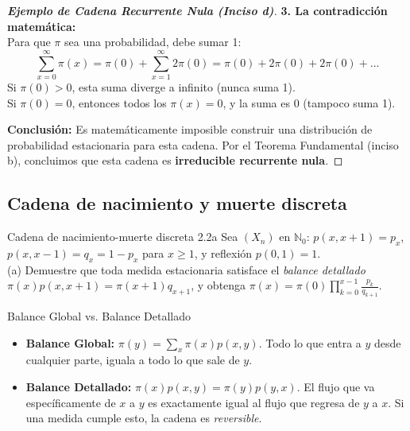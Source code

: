 \documentclass[10pt,a4paper]{article}
\begin{document}
\begin{proof}[\textbf{Ejemplo de Cadena Recurrente Nula (Inciso d)}]
    \textbf{3. La contradicción matemática:} \\
    Para que $\pi$ sea una probabilidad, debe sumar 1:
    \[ \sum_{x=0}^{\infty} \pi(x) = \pi(0) + \sum_{x=1}^{\infty} 2\pi(0) = \pi(0) + 2\pi(0) + 2\pi(0) + \dots \]
    Si $\pi(0) > 0$, esta suma diverge a infinito (nunca suma 1). \\
    Si $\pi(0) = 0$, entonces todos los $\pi(x) = 0$, y la suma es 0 (tampoco suma 1).
    
    \textbf{Conclusión:} Es matemáticamente imposible construir una distribución de probabilidad estacionaria para esta cadena. Por el Teorema Fundamental (inciso b), concluimos que esta cadena es \textbf{irreducible recurrente nula}.
\end{proof}

\newpage
\subsection{Cadena de nacimiento y muerte discreta}

\vspace{5mm}

\begin{ejercicio}{Cadena de nacimiento-muerte discreta }{2.2a}
    Sea $(X_n)$ en $\mathbb{N}_0$: $p(x, x+1) = p_x$, $p(x, x-1) = q_x = 1 - p_x$ para $x \ge 1$, y reflexión $p(0,1) = 1$. \\
    (a) Demuestre que toda medida estacionaria satisface el \textit{balance detallado} $\pi(x)p(x, x+1) = \pi(x+1)q_{x+1}$, y obtenga $\pi(x) = \pi(0) \prod_{k=0}^{x-1} \frac{p_k}{q_{k+1}}$.
\end{ejercicio}

\vspace{2mm}

\begin{nota}{Balance Global vs. Balance Detallado}
    \begin{itemize}
        \item \textbf{Balance Global:} $\pi(y) = \sum_x \pi(x)p(x,y)$. Todo lo que entra a $y$ desde cualquier parte, iguala a todo lo que sale de $y$.
        \item \textbf{Balance Detallado:} $\pi(x)p(x,y) = \pi(y)p(y,x)$. El flujo que va específicamente de $x$ a $y$ es exactamente igual al flujo que regresa de $y$ a $x$. 
        Si una medida cumple esto, la cadena es \textit{reversible}.
    \end{itemize}
\end{nota}
\end{document}
